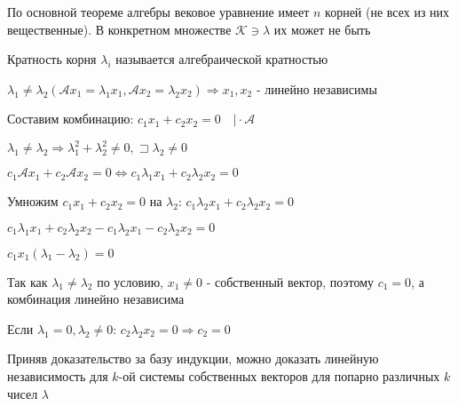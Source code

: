 \documentclass[12pt]{article}
\begin{document}
    \Nota По основной теореме алгебры вековое уравнение имеет $n$ корней (не всех из них вещественные).
    В конкретном множестве $\mathcal{K} \ni \lambda$ их может не быть

    \Def Кратность корня $\lambda_i$ называется алгебраической кратностью

    \begin{MyTheorem}
        \Ths $\lambda_1 \neq \lambda_2 (\mathcal{A}x_1 = \lambda_1 x_1, \mathcal{A}x_2 = \lambda_2 x_2) \Longrightarrow x_1, x_2$ - линейно независимы
    \end{MyTheorem}

    \begin{MyProof}
        Составим комбинацию: $c_1 x_1 + c_2 x_2 = 0 \quad \Big| \cdot \mathcal{A}$

        $\lambda_1 \neq \lambda_2 \Longrightarrow \lambda_1^2 + \lambda_2^2 \neq 0, \sqsupset \lambda_2 \neq 0$

        $c_1 \mathcal{A} x_1 + c_2 \mathcal{A} x_2 = 0 \Longleftrightarrow c_1 \lambda_1 x_1 + c_2 \lambda_2 x_2 = 0$

        Умножим $c_1 x_1 + c_2 x_2 = 0$ на $\lambda_2$: $c_1 \lambda_2 x_1 + c_2 \lambda_2 x_2 = 0$

        $c_1 \lambda_1 x_1 + c_2 \lambda_2 x_2 - c_1 \lambda_2 x_1 - c_2 \lambda_2 x_2 = 0$

        $c_1 x_1(\lambda_1 - \lambda_2) = 0$

        Так как $\lambda_1 \neq \lambda_2$ по условию, $x_1 \neq 0$ - собственный вектор, поэтому $c_1 = 0$, а комбинация линейно независима

        Если $\lambda_1 = 0, \lambda_2 \neq 0$: $c_2 \lambda_2 x_2 = 0 \Longrightarrow c_2 = 0$
    \end{MyProof}

    \Nota Приняв доказательство за базу индукции, можно доказать линейную независимость для $k$-ой системы собственных векторов для попарно различных $k$ чисел $\lambda$
\end{document}
